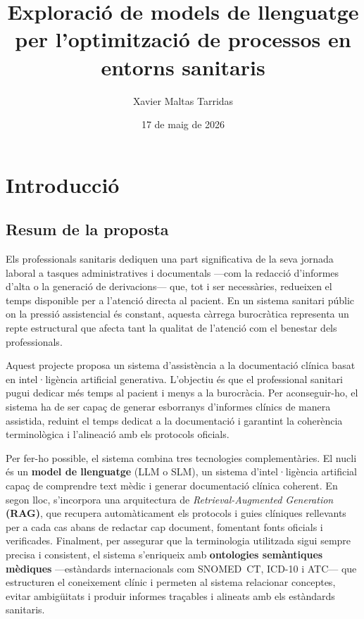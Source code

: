 \documentclass[CAT]{TFUOC}%
\title{Exploració de models de llenguatge per l'optimització de processos en entorns sanitaris}
\author{Xavier Maltas Tarridas}
\date{17 de maig de 2026}
\begin{document}
\estructura

\tableofcontents

\listoffigures

\listoftables




\chapter{Introducció}

\section{Resum de la proposta}

Els professionals sanitaris dediquen una part significativa de la seva jornada laboral a tasques administratives i documentals ---com la redacció d'informes d'alta o la generació de derivacions--- que, tot i ser necessàries, redueixen el temps disponible per a l'atenció directa al pacient. En un sistema sanitari públic on la pressió assistencial és constant, aquesta càrrega burocràtica representa un repte estructural que afecta tant la qualitat de l'atenció com el benestar dels professionals.

Aquest projecte proposa un sistema d'assistència a la documentació clínica basat en intel·ligència artificial generativa. L'objectiu és que el professional sanitari pugui dedicar més temps al pacient i menys a la burocràcia. Per aconseguir-ho, el sistema ha de ser capaç de generar esborranys d'informes clínics de manera assistida, reduint el temps dedicat a la documentació i garantint la coherència terminològica i l'alineació amb els protocols oficials.

Per fer-ho possible, el sistema combina tres tecnologies complementàries. El nucli és un \textbf{model de llenguatge} (LLM o SLM), un sistema d'intel·ligència artificial capaç de comprendre text mèdic i generar documentació clínica coherent. En segon lloc, s'incorpora una arquitectura de \textit{Retrieval-Augmented Generation} \textbf{(RAG)}, que recupera automàticament els protocols i guies clíniques rellevants per a cada cas abans de redactar cap document, fomentant fonts oficials i verificades. Finalment, per assegurar que la terminologia utilitzada sigui sempre precisa i consistent, el sistema s'enriqueix amb \textbf{ontologies semàntiques mèdiques} ---estàndards internacionals com SNOMED~CT, ICD-10 i ATC--- que estructuren el coneixement clínic i permeten al sistema relacionar conceptes, evitar ambigüitats i produir informes traçables i alineats amb els estàndards sanitaris.
\end{document}
